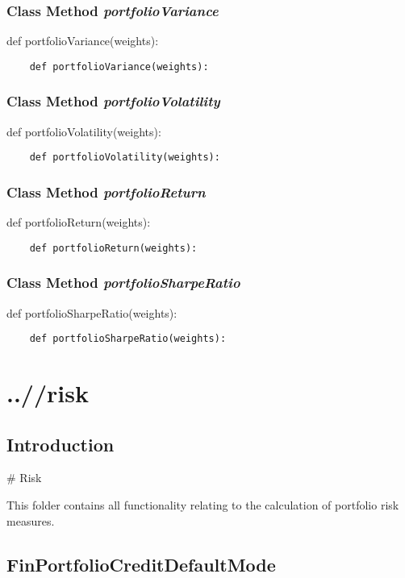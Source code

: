 \documentclass[twoside,11pt]{book}
\begin{document}
\subsection{Class Method {\it portfolioVariance}}
def portfolioVariance(weights):

\begin{lstlisting}
    def portfolioVariance(weights):
\end{lstlisting}

\subsection{Class Method {\it portfolioVolatility}}
def portfolioVolatility(weights):

\begin{lstlisting}
    def portfolioVolatility(weights):
\end{lstlisting}

\subsection{Class Method {\it portfolioReturn}}
def portfolioReturn(weights):

\begin{lstlisting}
    def portfolioReturn(weights):
\end{lstlisting}

\subsection{Class Method {\it portfolioSharpeRatio}}
def portfolioSharpeRatio(weights):

\begin{lstlisting}
    def portfolioSharpeRatio(weights):
\end{lstlisting}


\chapter{..//risk}
\section{Introduction}
# Risk

This folder contains all functionality relating to the calculation of portfolio risk measures. 
\newpage
\section{FinPortfolioCreditDefaultMode}
\end{document}
